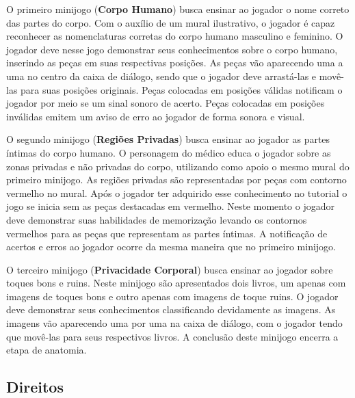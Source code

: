 O primeiro minijogo (\textbf{Corpo Humano}) busca ensinar ao jogador o nome correto das partes do corpo. Com o auxílio de um mural ilustrativo, o jogador é capaz reconhecer as nomenclaturas corretas do corpo humano masculino e feminino. %
O jogador deve nesse jogo demonstrar seus conhecimentos sobre o corpo humano, inserindo as peças em suas respectivas posições. As peças vão aparecendo uma a uma no centro da caixa de diálogo, sendo que o jogador deve arrastá-las e movê-las para suas posições originais. Peças colocadas em posições válidas notificam o jogador por meio se um sinal sonoro de acerto. Peças colocadas em posições inválidas emitem um aviso de erro ao jogador de forma sonora e visual. 

O segundo minijogo (\textbf{Regiões Privadas}) busca ensinar ao jogador as partes íntimas do corpo humano. O personagem do médico educa o jogador sobre as zonas privadas e não privadas do corpo, utilizando como apoio o mesmo mural do primeiro minijogo. As regiões privadas são representadas por peças com contorno vermelho no mural. Após o jogador ter adquirido esse conhecimento no tutorial o jogo se inicia sem as peças destacadas em vermelho. Neste momento o jogador deve demonstrar suas habilidades de memorização levando os contornos vermelhos para as peças que representam as partes íntimas. A notificação de acertos e erros ao jogador ocorre da mesma maneira que no primeiro minijogo. %

O terceiro minijogo (\textbf{Privacidade Corporal}) busca ensinar ao jogador sobre toques bons e ruins. Neste minijogo são apresentados dois livros, um apenas com imagens de toques bons e outro apenas com imagens de toque ruins. %
O jogador deve demonstrar seus conhecimentos classificando devidamente as imagens. As imagens vão aparecendo uma por uma na caixa de diálogo, com o jogador tendo que movê-las para seus respectivos livros. A conclusão deste minijogo encerra a etapa de anatomia. %


\subsection{Direitos}\label{subsec:2}

